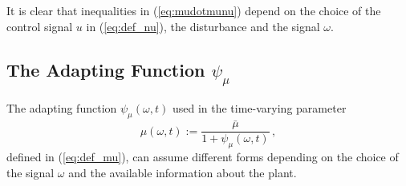 \documentclass[letterpaper, 10 pt, journal, twocolumn]{IEEEtran}  %
\theoremstyle{plain}
\theoremstyle{definition}
\theoremstyle{remark}
\begin{document}
It is clear that inequalities in (\ref{eq:mudotmunu}) depend on the choice of the control signal $u$ in (\ref{eq:def_nu}), the disturbance and the signal $\omega$. 

\subsection{The Adapting Function $\psi_\mu$}

The adapting function $\psi_\mu(\omega,t)$ used in the time-varying parameter 
%
\begin{equation}
\mu(\omega,t):=\frac{\bar{\mu}}{1+
\psi_\mu(\omega,t)}\,,%
\end{equation}
%
defined in (\ref{eq:def_mu}), can assume different forms depending on the choice of the signal $\omega$ and the available information about the plant. 
\end{document}
